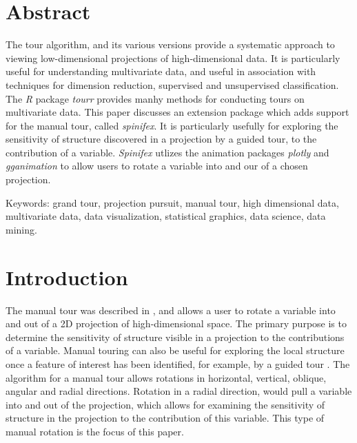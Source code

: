 \documentclass{monashthesis}
\begin{document}
\hypertarget{abstract-1}{%
\section{Abstract}\label{abstract-1}}

The tour algorithm, and its various versions provide a systematic approach to viewing low-dimensional projections of high-dimensional data. It is particularly useful for understanding multivariate data, and useful in association with techniques for dimension reduction, supervised and unsupervised classification. The \emph{R} package \emph{tourr} provides manhy methods for conducting tours on multivariate data. This paper discusses an extension package which adds support for the manual tour, called \emph{spinifex}. It is particularly usefully for exploring the sensitivity of structure discovered in a projection by a guided tour, to the contribution of a variable. \emph{Spinifex} utlizes the animation packages \emph{plotly} and \emph{gganimation} to allow users to rotate a variable into and our of a chosen projection.

Keywords: grand tour, projection pursuit, manual tour, high dimensional data, multivariate data, data visualization, statistical graphics, data science, data mining.

\hypertarget{introduction}{%
\section{Introduction}\label{introduction}}

The manual tour was described in \textcite{cook_manual_1997}, and allows a user to rotate a variable into and out of a 2D projection of high-dimensional space. The primary purpose is to determine the sensitivity of structure visible in a projection to the contributions of a variable. Manual touring can also be useful for exploring the local structure once a feature of interest has been identified, for example, by a guided tour \autocite{cook_grand_1995}. The algorithm for a manual tour allows rotations in horizontal, vertical, oblique, angular and radial directions. Rotation in a radial direction, would pull a variable into and out of the projection, which allows for examining the sensitivity of structure in the projection to the contribution of this variable. This type of manual rotation is the focus of this paper.
\end{document}
